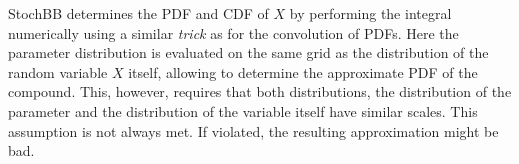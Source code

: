 StochBB determines the PDF and CDF of $X$ by performing the integral numerically using a similar \emph{trick}
as for the convolution of PDFs. Here the parameter distribution is evaluated on the same grid as the distribution
of the random variable $X$ itself, allowing to determine the approximate PDF of the compound. This, however, requires 
that both distributions, the distribution of the parameter and the distribution of the variable itself have similar 
scales. This assumption is not always met. If violated, the resulting approximation might be bad.

